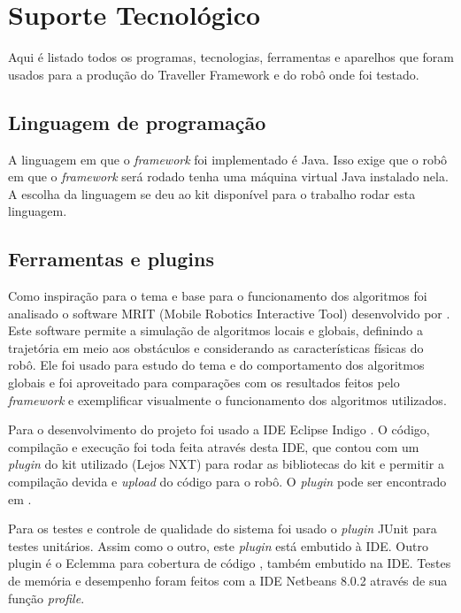 \chapter[Suporte Tecnológico]{Suporte Tecnológico}

Aqui é listado todos os programas, tecnologias, ferramentas e aparelhos que foram usados para a produção do Traveller Framework e do robô onde foi testado.

\section{Linguagem de programação}

A linguagem em que o \textit{framework} foi implementado é Java. Isso exige que o robô em que o \textit{framework} será rodado tenha uma máquina virtual Java instalado nela. A escolha da linguagem se deu ao kit disponível para o trabalho rodar esta linguagem.

\section{Ferramentas e plugins}

Como inspiração para o tema e base para o funcionamento dos algoritmos foi analisado o software MRIT (Mobile Robotics Interactive Tool) \cite{MRIT_SITE} desenvolvido por \cite{Guzman2008}. Este software permite a simulação de algoritmos locais e globais, definindo a trajetória em meio aos obstáculos e considerando as características físicas do robô. Ele foi usado para estudo do tema e do comportamento dos algoritmos globais e foi aproveitado para comparações com os resultados feitos pelo \textit{framework} e exemplificar visualmente o funcionamento dos algoritmos utilizados.

Para o desenvolvimento do projeto foi usado a IDE Eclipse Indigo \cite{ECLIPSE_SITE}. O código, compilação e execução foi toda feita através desta IDE, que contou com um \textit{plugin} do kit utilizado (Lejos NXT) para rodar as bibliotecas do kit e permitir a compilação devida e \textit{upload} do código para o robô. O \textit{plugin} pode ser encontrado em \cite{PLUGIN_NXT_SITE}.

Para os testes e controle de qualidade do sistema foi usado o \textit{plugin} JUnit \cite{JUNIT_SITE} para testes unitários. Assim como o outro, este \textit{plugin} está embutido à IDE. Outro plugin é o Eclemma para cobertura de código \cite{ECLEMMA_SITE}, também embutido na IDE. Testes de memória e desempenho foram feitos com a IDE Netbeans 8.0.2 através de sua função \textit{profile}.

